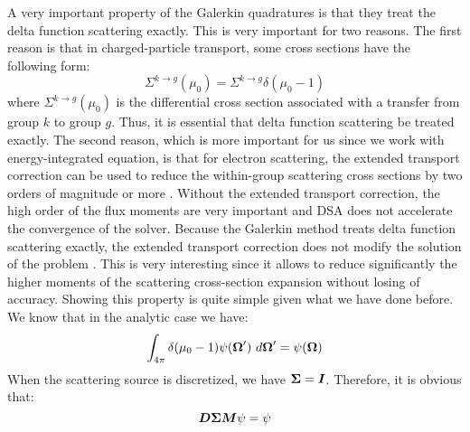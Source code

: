 A very important property of the Galerkin quadratures is that they treat the
delta function scattering exactly. This is very important for two reasons. 
The first reason is that in charged-particle transport, some cross sections 
have the following form:
\begin{equation}
\Sigma^{k\rightarrow g}(\mu_0) = \Sigma^{k\rightarrow g} \delta(\mu_0-1)
\end{equation}
where $\Sigma^{k\rightarrow g}(\mu_0)$ is the differential cross section
associated with a transfer from group $k$ to group $g$. Thus, it is essential
that delta function scattering be treated exactly. The second reason, which is
more important for us since we work with energy-integrated equation, is that for 
electron scattering, the extended transport correction can be used to reduce
the within-group scattering cross sections by two orders of magnitude or more 
\cite{morel_79}. Without the extended transport correction, the high order of 
the flux moments are very important and DSA does not accelerate the
convergence of the solver. Because the Galerkin method treats delta
function  scattering exactly, the extended transport correction does not
modify the solution of the problem \cite{morel_79}. This is very interesting 
since it allows to reduce significantly the higher moments of the scattering
cross-section expansion without losing of accuracy. Showing this property is
quite simple given what we have done before. We know that in the analytic case
we have:
\begin{equation}
\int_{4\pi} \delta(\mu_0-1) \psi(\boldsymbol{\Omega}')\ d\boldsymbol{\Omega}' = \psi(\boldsymbol{\Omega})
\end{equation}
When the scattering source is discretized, we have $\boldsymbol{\Sigma}=\boldsymbol{I}$.
Therefore, it is obvious that:
\begin{equation}
  \boldsymbol{D\Sigma M}\psi = \psi
\end{equation}

